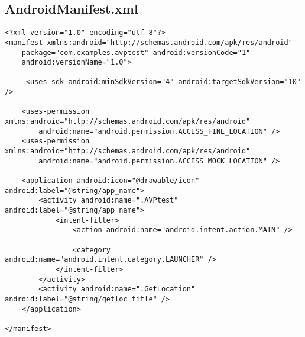 \documentclass[letterpaper,twocolumn,10pt]{article}
\begin{document}
\subsection{AndroidManifest.xml}
\begin{lstlisting}
<?xml version="1.0" encoding="utf-8"?>
<manifest xmlns:android="http://schemas.android.com/apk/res/android"
	package="com.examples.avptest" android:versionCode="1"
	android:versionName="1.0">
	
     <uses-sdk android:minSdkVersion="4" android:targetSdkVersion="10" />
    
	<uses-permission xmlns:android="http://schemas.android.com/apk/res/android"
		android:name="android.permission.ACCESS_FINE_LOCATION" />
	<uses-permission xmlns:android="http://schemas.android.com/apk/res/android"
		android:name="android.permission.ACCESS_MOCK_LOCATION" />

	<application android:icon="@drawable/icon" android:label="@string/app_name">
		<activity android:name=".AVPtest" android:label="@string/app_name">
			<intent-filter>
				<action android:name="android.intent.action.MAIN" />

				<category android:name="android.intent.category.LAUNCHER" />
			</intent-filter>
		</activity>
		<activity android:name=".GetLocation" android:label="@string/getloc_title" />
	</application>

</manifest>
\end{lstlisting}

\end{document}
